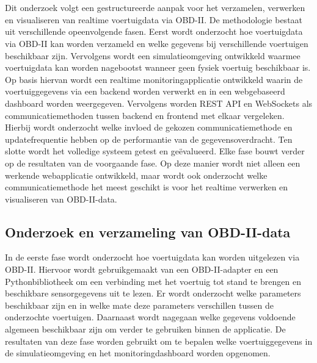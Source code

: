 \chapter{}%
\label{ch:methodologie}
Dit onderzoek volgt een gestructureerde aanpak voor het verzamelen, verwerken en visualiseren van realtime voertuigdata via OBD-II. De methodologie bestaat uit verschillende opeenvolgende fasen. Eerst wordt onderzocht hoe voertuigdata via OBD-II kan worden verzameld en welke gegevens bij verschillende voertuigen beschikbaar zijn. Vervolgens wordt een simulatieomgeving ontwikkeld waarmee voertuigdata kan worden nagebootst wanneer geen fysiek voertuig beschikbaar is.
Op basis hiervan wordt een realtime monitoringapplicatie ontwikkeld waarin de voertuiggegevens via een backend worden verwerkt en in een webgebaseerd dashboard worden weergegeven. Vervolgens worden REST API en WebSockets als communicatiemethoden tussen backend en frontend met elkaar vergeleken. Hierbij wordt onderzocht welke invloed de gekozen communicatiemethode en updatefrequentie hebben op de performantie van de gegevensoverdracht. Ten slotte wordt het volledige systeem getest en geëvalueerd.
Elke fase bouwt verder op de resultaten van de voorgaande fase. Op deze manier wordt niet alleen een werkende webapplicatie ontwikkeld, maar wordt ook onderzocht welke communicatiemethode het meest geschikt is voor het realtime verwerken en visualiseren van OBD-II-data.


\section{Onderzoek en verzameling van OBD-II-data}
In de eerste fase wordt onderzocht hoe voertuigdata kan worden uitgelezen via OBD-II. Hiervoor wordt gebruikgemaakt van een OBD-II-adapter en een Pythonbibliotheek om een verbinding met het voertuig tot stand te brengen en beschikbare sensorgegevens uit te lezen.
Er wordt onderzocht welke parameters beschikbaar zijn en in welke mate deze parameters verschillen tussen de onderzochte voertuigen. Daarnaast wordt nagegaan welke gegevens voldoende algemeen beschikbaar zijn om verder te gebruiken binnen de applicatie.
De resultaten van deze fase worden gebruikt om te bepalen welke voertuiggegevens in de simulatieomgeving en het monitoringdashboard worden opgenomen.

